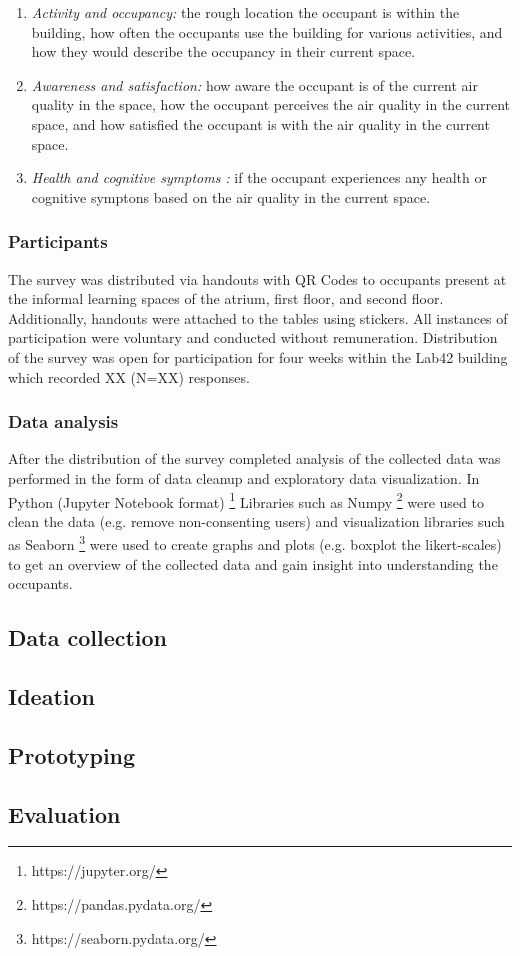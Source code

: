 \begin{enumerate}
  \item \textit{Activity and occupancy:} the rough location the occupant is within the building, how often the occupants use the building for various activities, and how they would describe the occupancy in their current space.
  \item \textit{Awareness and satisfaction:} how aware the occupant is of the current air quality in the space, how the occupant perceives the air quality in the current space, and how satisfied the occupant is with the air quality in the current space.
  \item \textit{Health and cognitive symptoms :} if the occupant experiences any health or cognitive symptons based on the air quality in the current space.
\end{enumerate}


\subsubsection{Participants}
The survey was distributed via handouts with QR Codes to occupants present at the informal learning spaces of the atrium, first floor, and second floor. Additionally, handouts were attached to the tables using stickers. All instances of participation were voluntary and conducted without remuneration. Distribution of the survey was open for participation for four weeks within the Lab42 building which recorded XX (N=XX) responses.

\subsubsection{Data analysis}
After the distribution of the survey completed analysis of the collected data was performed in the form of data cleanup and exploratory data visualization. In Python (Jupyter Notebook format) \footnote{https://jupyter.org/} Libraries such as Numpy \footnote{https://pandas.pydata.org/} were used to clean the data (e.g. remove non-consenting users) and visualization libraries such as Seaborn \footnote{https://seaborn.pydata.org/} were used to create graphs and plots (e.g. boxplot the likert-scales) to get an overview of the collected data and gain insight into understanding the occupants.

\subsection{Data collection}

\subsection{Ideation}

\subsection{Prototyping}

\subsection{Evaluation}
